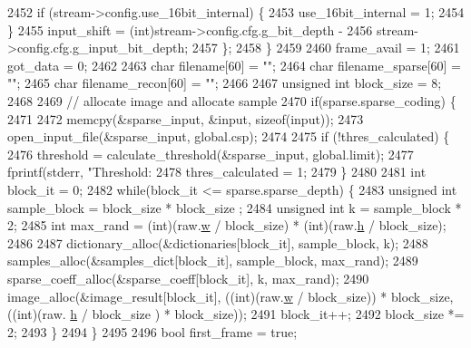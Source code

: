 \begin{DoxyCodeInclude}
{{{{{{{{{{{{{{{{{{{{{{{{{{{{{{{{{{{{{{{{{{{{{{{{{{{{{{{{{{{{{{{{{2452         \textcolor{keywordflow}{if} (stream->config.use\_16bit\_internal) \{
2453           use\_16bit\_internal = 1;
2454         \}
2455         input\_shift = (int)stream->config.cfg.g\_bit\_depth -
2456             stream->config.cfg.g\_input\_bit\_depth;
2457       \};
2458     \}
2459 
2460     frame\_avail = 1;
2461     got\_data = 0;
2462 
2463     \textcolor{keywordtype}{char} filename[60] = \textcolor{stringliteral}{""};
2464     \textcolor{keywordtype}{char} filename\_sparse[60] = \textcolor{stringliteral}{""};
2465     \textcolor{keywordtype}{char} filename\_recon[60] = \textcolor{stringliteral}{""};
2466 
2467     \textcolor{keywordtype}{unsigned} \textcolor{keywordtype}{int} block\_size = 8;
2468 
2469     \textcolor{comment}{// allocate image and allocate sample}
2470     \textcolor{keywordflow}{if}(sparse.sparse\_coding) \{
2471 
2472       memcpy(&sparse\_input, &input, \textcolor{keyword}{sizeof}(input));
2473       open\_input\_file(&sparse\_input, global.csp);
2474 
2475       \textcolor{keywordflow}{if} (!thres\_calculated) \{
2476         threshold = calculate\_threshold(&sparse\_input, global.limit);
2477         fprintf(stderr, \textcolor{stringliteral}{"Threshold: %
2478         thres\_calculated = 1;
2479       \}
2480 
2481       \textcolor{keywordtype}{int} block\_it = 0;
2482       \textcolor{keywordflow}{while}(block\_it <= sparse.sparse\_depth) \{
2483         \textcolor{keywordtype}{unsigned} \textcolor{keywordtype}{int} sample\_block = block\_size  * block\_size ;
2484         \textcolor{keywordtype}{unsigned} \textcolor{keywordtype}{int} k = sample\_block * 2;
2485         \textcolor{keywordtype}{int} max\_rand = (int)(raw.\hyperlink{structaom__image_a695141e492ab146dc15e8131827eb237}{w} / block\_size) * (int)(raw.\hyperlink{structaom__image_a3fcffff0a25a4fd9218ed38842014ef2}{h} / block\_size);
2486 
2487         dictionary\_alloc(&dictionaries[block\_it], sample\_block, k);
2488         samples\_alloc(&samples\_dict[block\_it], sample\_block, max\_rand);
2489         sparse\_coeff\_alloc(&sparse\_coeff[block\_it], k, max\_rand);
2490         image\_alloc(&image\_result[block\_it], ((\textcolor{keywordtype}{int})(raw.\hyperlink{structaom__image_a695141e492ab146dc15e8131827eb237}{w} / block\_size)) * block\_size, ((\textcolor{keywordtype}{int})(raw.
      \hyperlink{structaom__image_a3fcffff0a25a4fd9218ed38842014ef2}{h} / block\_size ) * block\_size));
2491         block\_it++;
2492         block\_size *= 2;
2493       \}
2494     \}
2495 
2496     \textcolor{keywordtype}{bool} first\_frame = \textcolor{keyword}{true};
}}}}}}}}}}}}}}}}}}}}}}}}}}}}}}}}}}}}}}}}}}}}}}}}}}}}}}}}}}}}}}}}}}
\end{DoxyCodeInclude}
